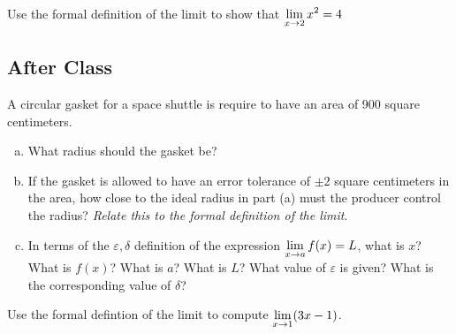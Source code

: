 \documentclass[notes]{subfiles}
\begin{document}
		\begin{ex}
			Use the formal definition of the limit to show that $\displaystyle \lim_{x\to 2} x^2 = 4$
		\end{ex}
			\newpage
			
	\subsection*{After Class}
		\begin{ex}
			A circular gasket for a space shuttle is require to have an area of 900 square centimeters.
			\begin{enumerate}[(a)]
				\item What radius should the gasket be?
					
				\item If the gasket is allowed to have an error tolerance of $\pm 2$ square centimeters in the area, how close to the ideal radius in part (a) must the producer control the radius? \emph{Relate this to the formal definition of the limit}.
					
				\item In terms of the $\varepsilon, \delta$ definition of the expression $\displaystyle \lim_{x\to a} f(x) = L$, what is $x$?  What is $f(x)$?  What is $a$?  What is $L$?  What value of $\varepsilon$ is given?  What is the corresponding value of $\delta$?
			\end{enumerate}
		\end{ex}
		
		\begin{ex}
			Use the formal defintion of the limit to compute $\displaystyle \lim_{x\to 1} (3x - 1)$.
		\end{ex}
	\clearpage
\end{document}

